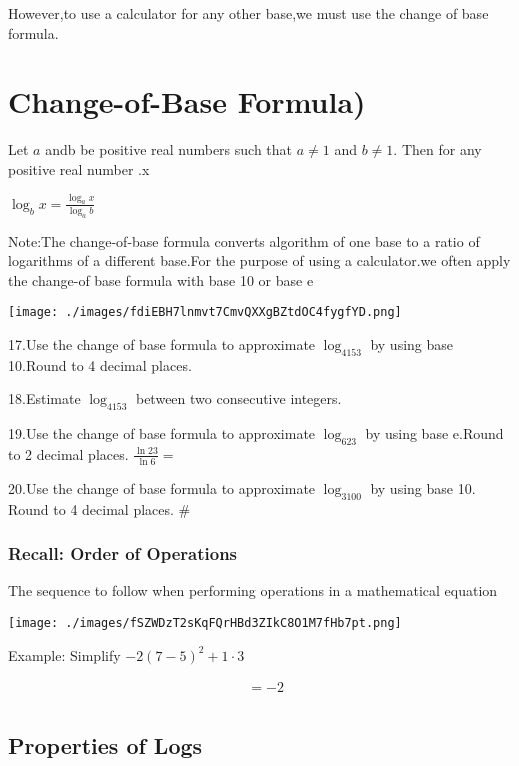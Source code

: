 \documentclass{book}
\begin{document}
However,to use a calculator for any other base,we must use the change
of base formula.

\section{Change-of-Base Formula)}\label{change-of-base-formula}

Let \(a\) andb be positive real numbers such that \(a\neq1\) and
\(b\neq1.\) Then for any positive real number .x

\(\log_bx=\frac{\log_ax}{\log_ab}\)

Note:The change-of-base formula converts algorithm of one base to a
ratio of logarithms of a different base.For the purpose of using a
calculator.we often apply the change-of base formula with base 10 or base
e

\texttt{[image: ./images/fdiEBH7lnmvt7CmvQXXgBZtdOC4fygfYD.png]}

17.Use the change of base formula to approximate \(\log_4153\) by using
base 10.Round to 4 decimal places.

18.Estimate \(\log_4153\) between two consecutive integers.

19.Use the change of base formula to approximate \(\log_623\) by using
base e.Round to 2 decimal places. \(\frac{\ln23}{\ln6}=\)

20.Use the change of base formula to approximate \(\log_3100\) by using
base 10. Round to 4 decimal places. \#

\subsubsection{Recall: Order of
	Operations}\label{recall-order-of-operations}

The sequence to follow when performing operations in a mathematical
equation

\texttt{[image: ./images/fSZWDzT2sKqFQrHBd3ZIkC8O1M7fHb7pt.png]}

Example: Simplify \(-2(7-5)^{2}+1\cdot3\)


	\begin{align}
		 & = -2 \\
	\end{align}


\subsection{Properties of Logs}\label{properties-of-logs}
\end{document}
